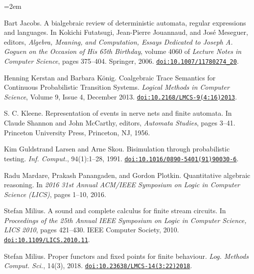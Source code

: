\documentclass[11pt,a4paper]{amsart}
\begin{document}
\begin{list}{}{\leftmargin=2em}
\hypertarget{html:bib.bib8}{}
\item[]  [8]  Bart Jacobs.  A bialgebraic review of deterministic automata, regular expressions and languages.  In Kokichi Futatsugi, Jean-Pierre Jouannaud, and José Meseguer, editors, \emph{Algebra, Meaning, and Computation, Essays Dedicated to Joseph A. Goguen on the Occasion of His 65th Birthday}, volume 4060 of \emph{Lecture Notes in Computer Science}, pages 375–404. Springer, 2006.  \href{https://doi.org/10.1007/11780274_20}{\nolinkurl{doi:10.1007/11780274_20}}.  
\hypertarget{html:bib.bib9}{}
\item[]  [9]  Henning Kerstan and Barbara König.  Coalgebraic Trace Semantics for Continuous Probabilistic Transition Systems.  \emph{Logical Methods in Computer Science}, Volume 9, Issue 4, December 2013.  \href{https://doi.org/10.2168/LMCS-9(4:16)2013}{\nolinkurl{doi:10.2168/LMCS-9(4:16)2013}}.  
\hypertarget{html:bib.bib10}{}
\item[]  [10]  S. C. Kleene.  Representation of events in nerve nets and finite automata.  In Claude Shannon and John McCarthy, editors, \emph{Automata Studies}, pages 3–41. Princeton University Press, Princeton, NJ, 1956.  
\hypertarget{html:bib.bib11}{}
\item[]  [11]  Kim Guldstrand Larsen and Arne Skou.  Bisimulation through probabilistic testing.  \emph{Inf. Comput.}, 94(1):1–28, 1991.  \href{https://doi.org/10.1016/0890-5401(91)90030-6}{\nolinkurl{doi:10.1016/0890-5401(91)90030-6}}.  
\hypertarget{html:bib.bib12}{}
\item[]  [12]  Radu Mardare, Prakash Panangaden, and Gordon Plotkin.  Quantitative algebraic reasoning.  In \emph{2016 31st Annual ACM/IEEE Symposium on Logic in Computer Science (LICS)}, pages 1–10, 2016.  
\hypertarget{html:bib.bib13}{}
\item[]  [13]  Stefan Milius.  A sound and complete calculus for finite stream circuits.  In \emph{Proceedings of the 25th Annual IEEE Symposium on Logic in Computer Science, LICS 2010}, pages 421–430. IEEE Computer Society, 2010.  \href{https://doi.org/10.1109/LICS.2010.11}{\nolinkurl{doi:10.1109/LICS.2010.11}}.  
\hypertarget{html:bib.bib14}{}
\item[]  [14]  Stefan Milius.  Proper functors and fixed points for finite behaviour.  \emph{Log. Methods Comput. Sci.}, 14(3), 2018.  \href{https://doi.org/10.23638/LMCS-14(3:22)2018}{\nolinkurl{doi:10.23638/LMCS-14(3:22)2018}}.  

\end{list}
\end{document}
